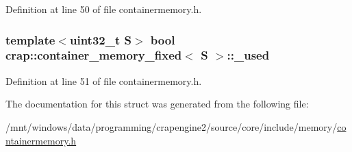 Definition at line 50 of file containermemory.\+h.

\hypertarget{structcrap_1_1container__memory__fixed_aa017408f7c4feeb5fe1ad88338a237ab}{}
\subsubsection[{\+\_\+used}]{\setlength{\rightskip}{0pt plus 5cm}template$<$uint32\+\_\+t S$>$ bool {\bf crap\+::container\+\_\+memory\+\_\+fixed}$<$ S $>$\+::\+\_\+used}\label{structcrap_1_1container__memory__fixed_aa017408f7c4feeb5fe1ad88338a237ab}


Definition at line 51 of file containermemory.\+h.



The documentation for this struct was generated from the following file\+:\begin{DoxyCompactItemize}
\item 
/mnt/windows/data/programming/crapengine2/source/core/include/memory/\hyperlink{containermemory_8h}{containermemory.\+h}\end{DoxyCompactItemize}

